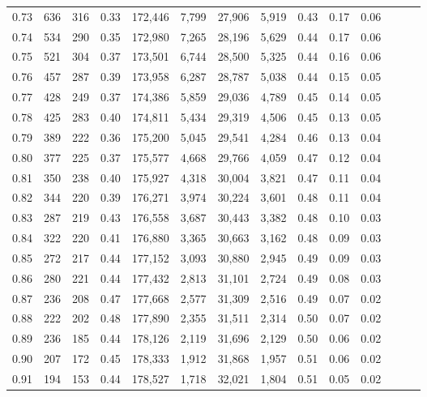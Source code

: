 \begin{tabular}{rrrrrrrrrrrrrr}
0.73 &    636 &  316 &  0.33 &  172,446 &    7,799 &  27,906 &   5,919 &  0.43 &  0.17 &      0.06 \\
0.74 &    534 &  290 &  0.35 &  172,980 &    7,265 &  28,196 &   5,629 &  0.44 &  0.17 &      0.06 \\
0.75 &    521 &  304 &  0.37 &  173,501 &    6,744 &  28,500 &   5,325 &  0.44 &  0.16 &      0.06 \\
0.76 &    457 &  287 &  0.39 &  173,958 &    6,287 &  28,787 &   5,038 &  0.44 &  0.15 &      0.05 \\
0.77 &    428 &  249 &  0.37 &  174,386 &    5,859 &  29,036 &   4,789 &  0.45 &  0.14 &      0.05 \\
0.78 &    425 &  283 &  0.40 &  174,811 &    5,434 &  29,319 &   4,506 &  0.45 &  0.13 &      0.05 \\
0.79 &    389 &  222 &  0.36 &  175,200 &    5,045 &  29,541 &   4,284 &  0.46 &  0.13 &      0.04 \\
0.80 &    377 &  225 &  0.37 &  175,577 &    4,668 &  29,766 &   4,059 &  0.47 &  0.12 &      0.04 \\
0.81 &    350 &  238 &  0.40 &  175,927 &    4,318 &  30,004 &   3,821 &  0.47 &  0.11 &      0.04 \\
0.82 &    344 &  220 &  0.39 &  176,271 &    3,974 &  30,224 &   3,601 &  0.48 &  0.11 &      0.04 \\
0.83 &    287 &  219 &  0.43 &  176,558 &    3,687 &  30,443 &   3,382 &  0.48 &  0.10 &      0.03 \\
0.84 &    322 &  220 &  0.41 &  176,880 &    3,365 &  30,663 &   3,162 &  0.48 &  0.09 &      0.03 \\
0.85 &    272 &  217 &  0.44 &  177,152 &    3,093 &  30,880 &   2,945 &  0.49 &  0.09 &      0.03 \\
0.86 &    280 &  221 &  0.44 &  177,432 &    2,813 &  31,101 &   2,724 &  0.49 &  0.08 &      0.03 \\
0.87 &    236 &  208 &  0.47 &  177,668 &    2,577 &  31,309 &   2,516 &  0.49 &  0.07 &      0.02 \\
0.88 &    222 &  202 &  0.48 &  177,890 &    2,355 &  31,511 &   2,314 &  0.50 &  0.07 &      0.02 \\
0.89 &    236 &  185 &  0.44 &  178,126 &    2,119 &  31,696 &   2,129 &  0.50 &  0.06 &      0.02 \\
0.90 &    207 &  172 &  0.45 &  178,333 &    1,912 &  31,868 &   1,957 &  0.51 &  0.06 &      0.02 \\
0.91 &    194 &  153 &  0.44 &  178,527 &    1,718 &  32,021 &   1,804 &  0.51 &  0.05 &      0.02 \\

\end{tabular}

